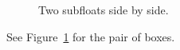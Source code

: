 \documentclass{article}
\begin{document}
\begin{figure}[ht]
\centering
\subfloat[Left]{\rule{3cm}{2cm}}\quad
\subfloat[Right]{\rule{3cm}{2cm}}
\caption{Two subfloats side by side.\label{fig:subs}}
\end{figure}
See Figure~\ref{fig:subs} for the pair of boxes.
\end{document}
